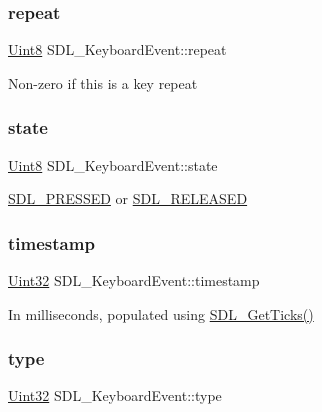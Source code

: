 \subsubsection{\texorpdfstring{repeat}{repeat}}
{\footnotesize\ttfamily \mbox{\hyperlink{_s_d_l__stdinc_8h_a2944638813a090aa23e62f4da842c3e2}{Uint8}} S\+D\+L\+\_\+\+Keyboard\+Event\+::repeat}

Non-\/zero if this is a key repeat \mbox{\label{struct_s_d_l___keyboard_event_a110558eb96c113c86cfa31a7018c2346}} 
\subsubsection{\texorpdfstring{state}{state}}
{\footnotesize\ttfamily \mbox{\hyperlink{_s_d_l__stdinc_8h_a2944638813a090aa23e62f4da842c3e2}{Uint8}} S\+D\+L\+\_\+\+Keyboard\+Event\+::state}

\mbox{\hyperlink{_s_d_l__events_8h_aee81bbffbc8489bdea8fecd1232c4bd1}{S\+D\+L\+\_\+\+P\+R\+E\+S\+S\+ED}} or \mbox{\hyperlink{_s_d_l__events_8h_ad680a069f9fcab80de91b3eefdf29c3c}{S\+D\+L\+\_\+\+R\+E\+L\+E\+A\+S\+ED}} \mbox{\label{struct_s_d_l___keyboard_event_a3da1d8f6892e7f6ee28d9eafdb5e7d02}} 
\subsubsection{\texorpdfstring{timestamp}{timestamp}}
{\footnotesize\ttfamily \mbox{\hyperlink{_s_d_l__stdinc_8h_add440eff171ea5f55cb00c4a9ab8672d}{Uint32}} S\+D\+L\+\_\+\+Keyboard\+Event\+::timestamp}

In milliseconds, populated using \mbox{\hyperlink{_s_d_l__timer_8h_a0b9bc71d6287e0ffafdc3419760fe2b3}{S\+D\+L\+\_\+\+Get\+Ticks()}} \mbox{\label{struct_s_d_l___keyboard_event_ae0b2f2aace6f80c1f47e5a14350d409a}} 
\subsubsection{\texorpdfstring{type}{type}}
{\footnotesize\ttfamily \mbox{\hyperlink{_s_d_l__stdinc_8h_add440eff171ea5f55cb00c4a9ab8672d}{Uint32}} S\+D\+L\+\_\+\+Keyboard\+Event\+::type}

